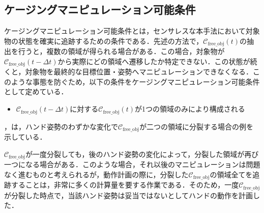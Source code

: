 \documentclass[a4paper,twoside,12pt,papersize, dvipdfmx]{iirthesis}
\begin{document}
\subsection*{ケージングマニピュレーション可能条件}
ケージングマニピュレーション可能条件とは，センサレスな本手法において対象物の状態を確実に追跡するための条件である．先述の方法で，$\mathcal{C}_{\mathrm{free\_obj}}(t)$の抽出を行うと，複数の領域が得られる場合がある．この場合，対象物が$\mathcal{C}_{\mathrm{free\_obj}}(t-\Delta t)$から実際にどの領域へ遷移したか特定できない．この状態が続くと，対象物を最終的な目標位置・姿勢へマニピュレーションできなくなる．このような事態を防ぐため，以下の条件をケージングマニピュレーション可能条件として定めている．
\begin{itemize}
\item $\mathcal{C}_{\mathrm{free\_obj}}(t-\Delta t)$に対する$\mathcal{C}_{\mathrm{free\_obj}}(t)$が1つの領域のみにより構成される
\end{itemize}

\figref{}，\figref{}は，ハンド姿勢のわずかな変化で$\mathcal{C}_{\mathrm{free\_obj}}$が二つの領域に分裂する場合の例を示している．\par
$\mathcal{C}_{\mathrm{free\_obj}}$が一度分裂しても，後のハンド姿勢の変化によって，分裂した領域が再び一つになる場合がある．このような場合，それ以後のマニピュレーションは問題なく進むものと考えられるが，動作計画の際に，分裂した$\mathcal{C}_{\mathrm{free\_obj}}$の領域全てを追跡することは，非常に多くの計算量を要する作業である．そのため，一度$\mathcal{C}_{\mathrm{free\_obj}}$が分裂した時点で，当該ハンド姿勢は妥当ではないとしてハンドの動作を計画した．
\end{document}
